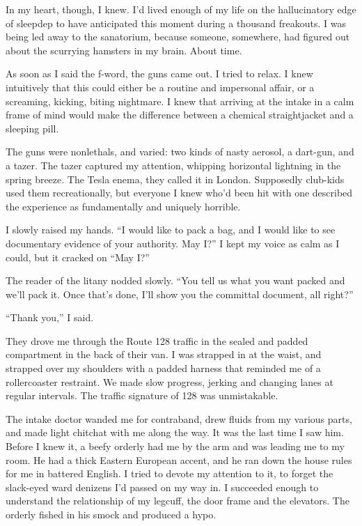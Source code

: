 In my heart, though, I knew. I’d lived enough of my life on the
hallucinatory edge of sleepdep to have anticipated this moment
during a thousand freakouts. I was being led away to the
sanatorium, because someone, somewhere, had figured out about the
scurrying hamsters in my brain. About time.

As soon as I said the f-word, the guns came out. I tried to relax.
I knew intuitively that this could either be a routine and
impersonal affair, or a screaming, kicking, biting nightmare. I
knew that arriving at the intake in a calm frame of mind would make
the difference between a chemical straightjacket and a sleeping
pill.

The guns were nonlethals, and varied: two kinds of nasty aero\-sol, a
dart-gun, and a tazer. The tazer captured my attention, whipping
horizontal lightning in the spring breeze. The Tesla enema, they
called it in London. Supposedly club-kids used them recreationally,
but everyone I knew who’d been hit with one described the
experience as fundamentally and uniquely horrible.

I slowly raised my hands. “I would like to pack a bag, and I would
like to see documentary evidence of your authority. May I?” I kept
my voice as calm as I could, but it cracked on “May I?”

The reader of the litany nodded slowly. “You tell us what you want
packed and we’ll pack it. Once that’s done, I’ll show you the
committal document, all right?”

“Thank you,” I said.

They drove me through the Route 128 traffic in the sealed and
padded compartment in the back of their van. I was strapped in at
the waist, and strapped over my shoulders with a padded harness
that reminded me of a rollercoaster restraint. We made slow
progress, jerking and changing lanes at regular intervals. The
traffic signature of 128 was unmistakable.

The intake doctor wanded me for contraband, drew fluids from my
various parts, and made light chitchat with me along the way. It
was the last time I saw him. Before I knew it, a beefy orderly had
me by the arm and was leading me to my room. He had a thick Eastern
European accent, and he ran down the house rules for me in battered
English. I tried to devote my attention to it, to forget the
slack-eyed ward denizens I’d passed on my way in. I succeeded
enough to understand the relationship of my legcuff, the door frame
and the elevators. The orderly fished in his smock and produced a
hypo.

